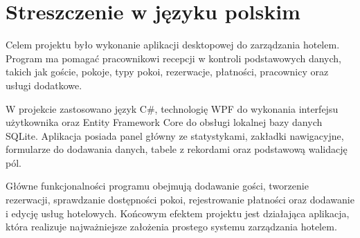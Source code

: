 \chapter*{Streszczenie w języku polskim}

Celem projektu było wykonanie aplikacji desktopowej do zarządzania hotelem. Program ma pomagać pracownikowi recepcji w kontroli podstawowych danych, takich jak goście, pokoje, typy pokoi, rezerwacje, płatności, pracownicy oraz usługi dodatkowe.

W projekcie zastosowano język C\#, technologię WPF do wykonania interfejsu użytkownika oraz Entity Framework Core do obsługi lokalnej bazy danych SQLite. Aplikacja posiada panel główny ze statystykami, zakładki nawigacyjne, formularze do dodawania danych, tabele z rekordami oraz podstawową walidację pól.

Główne funkcjonalności programu obejmują dodawanie gości, tworzenie rezerwacji, sprawdzanie dostępności pokoi, rejestrowanie płatności oraz dodawanie i edycję usług hotelowych. Końcowym efektem projektu jest działająca aplikacja, która realizuje najważniejsze założenia prostego systemu zarządzania hotelem.
